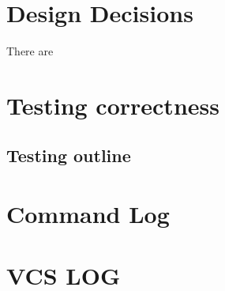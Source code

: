 \documentclass[onecolumn, draftclsnofoot,10pt, compsoc]{IEEEtran}
\begin{document}
	\section{Design Decisions}
    
    There are 

	\section{Testing correctness}

	\subsection{Testing outline}

	\section{Command Log}

	\section{VCS LOG}

        
\end{document}
